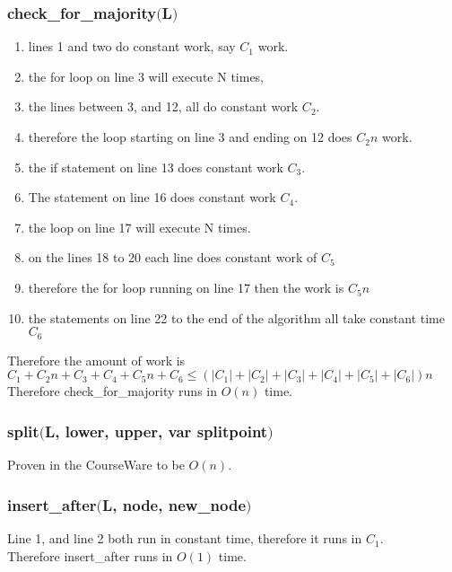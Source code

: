\documentclass{article}
\begin{document}
      \subsubsection{check\_for\_majority$($L$)$}
        \begin{enumerate}
          \item lines 1 and two do constant work, say $C_{1}$ work.
          \item the for loop on line 3 will execute N times,
          \item the lines between 3, and 12, all do constant work $C_{2}$.
          \item therefore the loop starting on line 3 and ending on 12 does $C_{2}n$ work.
          \item the if statement on line 13 does constant work $C_{3}$.
          \item The statement on line 16 does constant work $C_{4}$.
          \item the loop on line 17 will execute N times.
          \item on the lines 18 to 20 each line does constant work of $C_{5}$
          \item therefore the for loop running on line 17 then the work is $C_{5}n$
          \item the statements on line 22 to the end of the algorithm all take constant time $C_{6}$
        \end{enumerate}
        Therefore the amount of work is $C_{1} + C_{2}n + C_{3} + C_{4} + C_{5}n + C_{6} \leq (|C_{1}| + |C_{2}| + |C_{3}| + |C_{4}| + |C_{5}| + |C_{6}|)n$ \\
        Therefore check\_for\_majority runs in $O(n)$ time.
      \subsubsection{split$($L, lower, upper, var splitpoint$)$}
        Proven in the CourseWare to be $O(n)$.
        
      \subsubsection{insert\_after$($L, node, new\_node$)$}
        Line 1, and line 2 both run in constant time, therefore it runs in $C_{1}$. \\
        Therefore insert\_after runs in $O(1)$ time.
\end{document}

